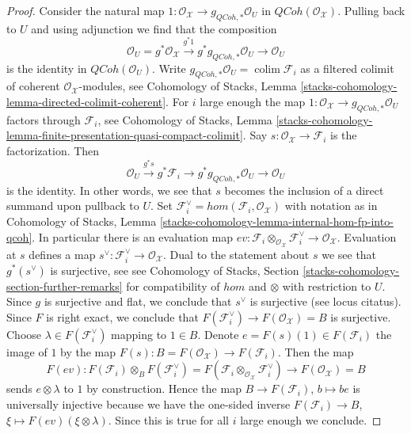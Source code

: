 \documentclass{stacks-project}
\theoremstyle{plain}
\theoremstyle{definition}
\theoremstyle{remark}
\numberwithin{equation}{subsection}
\def\colim{\mathop{\mathrm{colim}}\nolimits}
\def\QCoh{\mathit{QCoh}}
\begin{document}
\begin{proof}
Consider the natural map
$1 : \mathcal{O}_\mathcal{X} \to g_{\QCoh, *}\mathcal{O}_U$
in $\QCoh(\mathcal{O}_\mathcal{X})$. Pulling back to $U$ and
using adjunction we find that the composition
$$
\mathcal{O}_U =
g^*\mathcal{O}_\mathcal{X} \xrightarrow{g^*1}
g^*g_{\QCoh, *}\mathcal{O}_U \to \mathcal{O}_U
$$
is the identity in $\QCoh(\mathcal{O}_U)$.
Write $g_{\QCoh, *}\mathcal{O}_U = \colim \mathcal{F}_i$
as a filtered colimit of coherent $\mathcal{O}_\mathcal{X}$-modules, see
Cohomology of Stacks, Lemma
\ref{stacks-cohomology-lemma-directed-colimit-coherent}.
For $i$ large enough the map
$1 : \mathcal{O}_\mathcal{X} \to g_{\QCoh, *}\mathcal{O}_U$
factors through $\mathcal{F}_i$, see
Cohomology of Stacks, Lemma
\ref{stacks-cohomology-lemma-finite-presentation-quasi-compact-colimit}.
Say $s : \mathcal{O}_\mathcal{X} \to \mathcal{F}_i$ is the
factorization. Then
$$
\mathcal{O}_U \xrightarrow{g^*s} g^*\mathcal{F}_i \to
g^*g_{\QCoh, *}\mathcal{O}_U \to \mathcal{O}_U
$$
is the identity. In other words, we see that $s$ becomes the
inclusion of a direct summand upon pullback to $U$. Set
$\mathcal{F}_i^\vee = hom(\mathcal{F}_i, \mathcal{O}_\mathcal{X})$
with notation as in
Cohomology of Stacks, Lemma
\ref{stacks-cohomology-lemma-internal-hom-fp-into-qcoh}.
In particular there is an evaluation map
$ev : \mathcal{F}_i \otimes_{\mathcal{O}_\mathcal{X}} \mathcal{F}_i^\vee
\to \mathcal{O}_\mathcal{X}$.
Evaluation at $s$ defines a map
$s^\vee : \mathcal{F}_i^\vee \to \mathcal{O}_\mathcal{X}$.
Dual to the statement about $s$ we see that $g^*(s^\vee)$ is surjective, see
see Cohomology of Stacks, Section
\ref{stacks-cohomology-section-further-remarks}
for compatibility of $hom$ and $\otimes$ with restriction to $U$.
Since $g$ is surjective and flat, we conclude that $s^\vee$ is surjective
(see locus citatus). Since $F$ is right exact, we conclude that
$F(\mathcal{F}_i^\vee) \to F(\mathcal{O}_\mathcal{X}) = B$ is surjective.
Choose $\lambda \in F(\mathcal{F}_i^\vee)$
mapping to $1 \in B$. Denote $e = F(s)(1) \in F(\mathcal{F}_i)$
the image of $1$ by the map
$F(s) : B = F(\mathcal{O}_\mathcal{X}) \to F(\mathcal{F}_i)$.
Then the map
$$
F(ev) :
F(\mathcal{F}_i) \otimes_B F(\mathcal{F}_i^\vee) =
F(\mathcal{F}_i \otimes_{\mathcal{O}_\mathcal{X}} \mathcal{F}_i^\vee)
\longrightarrow
F(\mathcal{O}_\mathcal{X}) = B
$$
sends $e \otimes \lambda$ to $1$ by construction. Hence the
map $B \to F(\mathcal{F}_i)$, $b \mapsto be$
is universally injective because we have the one-sided
inverse $F(\mathcal{F}_i) \to B$, $\xi \mapsto F(ev)(\xi \otimes \lambda)$.
Since this is true for all $i$ large enough we conclude.
\end{proof}
\end{document}
